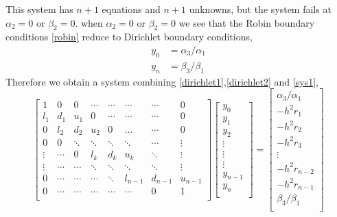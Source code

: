 \documentclass[12pt]{article}
\begin{document}
	This system has $ n+1 $ equations and $ n+1 $ unknowns, but the system fails at $ \alpha_2= 0 $ or $\beta_2 = 0 $.
	when $ \alpha_2 = 0 $ or $\beta_2 = 0 $ we see that the Robin boundary conditions \ref{robin} reduce to Dirichlet boundary conditions,
	\begin{align}\label{dirichlet1}
		 y_0 &= \alpha_3/\alpha_1 \\
		 y_n &= \beta_3/\beta_1 \label{dirichlet2}
	\end{align}
	Therefore we obtain a system combining \ref{dirichlet1},\ref{dirichlet2} and \ref{sys1},
	\begin{equation} \label{sys3}
	\left[ \begin{matrix}
		1 & 0 & 0 & \cdots &\cdots &\cdots&\cdots& 0\\
		l_1 & d_1 & u_1 & 0 &\cdots &\cdots&\cdots& 0\\
		0&l_2 & d_2 & u_2 &0 &\dots&\cdots& 0\\
		0&0 & \ddots & \ddots &\ddots &\ddots&\cdots & \vdots\\
		\vdots&\cdots&0&l_k & d_k & u_k &\ddots& \vdots\\
		\vdots&\cdots&\cdots&\ddots & \ddots & \ddots &\ddots& \vdots\\
		0&\cdots&\cdots& \cdots&\ddots & l_{n-1} &d_{n-1}& u_{n-1}\\
		0&\cdots&\cdots& \cdots&\cdots & \cdots & 0 & 1 \\
	\end{matrix} \right]
	\left[ \begin{matrix}
		y_0\\
		y_1\\
		y_2\\
		\vdots\\
		\vdots\\
		\vdots\\
		y_{n-1}\\
		y_{n}\\
	\end{matrix} \right] =
	\left[ \begin{matrix}
		\alpha_3/\alpha_1 \\
		- h^2 r_1\\
		- h^2 r_2\\
		- h^2 r_3\\
		\vdots\\
		- h^2 r_{n-2}\\
		- h^2 r_{n-1}\\
		\beta_3/\beta_1\\
	\end{matrix} \right]
	\end{equation}
\end{document}
